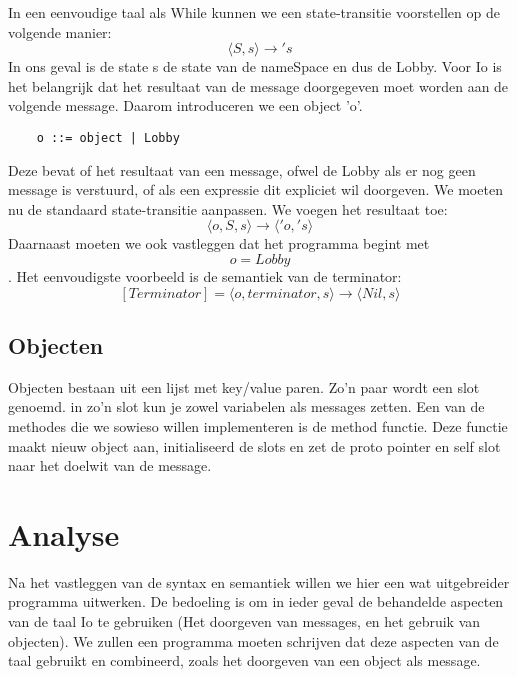 \documentclass[12pt]{article}
\begin{document}
In een eenvoudige taal als While kunnen we een state-transitie voorstellen op de volgende manier:
\[\langle S,s \rangle \rightarrow \prime s\]
In ons geval is de state s de state van de nameSpace en dus de Lobby.
Voor Io is het belangrijk dat het resultaat van de message doorgegeven moet worden aan de volgende message. Daarom introduceren we een object 'o'.
\begin{lstlisting}
	o ::= object | Lobby
\end{lstlisting}
Deze bevat of het resultaat van een message, ofwel de Lobby als er nog geen message is verstuurd, of als een expressie dit expliciet wil doorgeven. We moeten nu de standaard state-transitie aanpassen. We voegen het resultaat toe:
\[\langle o,S,s \rangle \rightarrow \langle \prime o,\prime s \rangle\]
Daarnaast moeten we ook vastleggen dat het programma begint met \[o = Lobby\]. Het eenvoudigste voorbeeld is de semantiek van de terminator:
\[[Terminator] = \langle o, terminator, s\rangle \rightarrow \langle Nil, s\rangle\]

\subsection{Objecten}
Objecten bestaan uit een lijst met key/value paren. Zo'n paar wordt een slot genoemd.
in zo'n slot kun je zowel variabelen als messages zetten.
Een van de methodes die we sowieso willen implementeren is de method functie. 
Deze functie maakt nieuw object aan, initialiseerd de slots en zet de proto pointer en self slot naar het doelwit van de message. 

\section{Analyse}
Na het vastleggen van de syntax en semantiek willen we hier een wat uitgebreider programma uitwerken. De bedoeling is om in ieder geval de behandelde aspecten van de taal Io te gebruiken (Het doorgeven van messages, en het gebruik van objecten). We zullen een programma moeten schrijven dat deze aspecten van de taal gebruikt en combineerd, zoals het doorgeven van een object als message.
\end{document}
